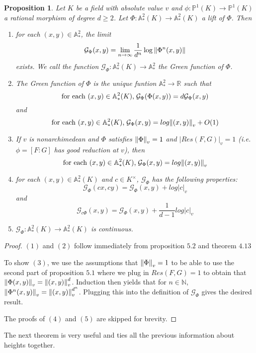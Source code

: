 \documentclass[12pt]{amsart}
\newtheorem{prop}[thm]{Proposition}
\theoremstyle{definition}
\theoremstyle{remark}
\theoremstyle{definition}
\newcommand{\R}{\mathbb{R}}
\newcommand{\AFAF}{\mathbb{A}^2}
\newcommand{\N}{\mathbb{N}}
\renewcommand{\P}{\mathbb{P}}
\newcommand{\MCG}{\mathcal{G}}
\begin{document}
\begin{prop}
Let $K$ be a field with absolute value $v$ and $\phi:\P^1(K) \rightarrow \P^1(K)$ a rational morphism of degree $d \geq 2$. Let $\Phi: \AFAF_*(K) \rightarrow \AFAF_*(K)$ a lift of $\Phi$. Then \begin{enumerate}
\item for each $(x,y) \in \AFAF_*$, the limit $$\MCG_{\Phi}(x,y) = \lim_{n \rightarrow \infty}\frac{1}{d^n}\log \norm{\Phi^n(x,y)}$$ exists. We call the function $\MCG_{\Phi}: \AFAF_*(K) \rightarrow \AFAF_*$ the Green function of $\Phi$.
\item The Green function of $\Phi$ is the unique funtion $\AFAF_* \rightarrow \R$ such that $$\text{for each $(x,y) \in \AFAF_*(K)$,\hspace{1mm}$\MCG_{\Phi}(\Phi(x,y)) = d\MCG_{\Phi}(x,y)$}$$ and $$\text{for each $(x,y) \in \AFAF_*(K)$,\hspace{1mm}$\MCG_{\Phi}(x,y) = log\norm{(x,y)}_v+O(1)$}$$
\item If $v$ is nonarchimedean and $\Phi$ satisfies $\norm{\Phi}_v = 1$ and $|Res(F,G)|_v = 1$ (i.e. $\phi = [F:G]$ has good reduction at $v$), then $$\text{for each } (x,y) \in \AFAF_*(K)\text{,\hspace{1mm}}\MCG_{\Phi}(x,y) = log\norm{(x,y)}_v$$
\item for each $(x,y) \in \AFAF_*(K)$ and $c \in K^{\times}$,  $\MCG_{\Phi}$ has the following properties: $$\MCG_{\Phi}(cx,cy) = \MCG_{\Phi}(x,y) + log|c|_v$$ and $$\MCG_{c \Phi}(x,y) = \MCG_{\Phi}(x,y) + \frac{1}{d-1}log|c|_v$$
\item $\MCG_{\Phi}: \AFAF_*(K) \rightarrow \AFAF_*(K)$ is continuous.
\end{enumerate}
\end{prop}

\begin{proof}
$(1)$ and $(2)$ follow immediately from proposition $5.2$ and theorem $4.13$

To show $(3)$, we use the assumptions that $\norm{\Phi}_v = 1$ to be able to use the second part of proposition $5.1$ where we plug in $Res(F,G) = 1$ to obtain that $\norm{\Phi(x,y)}_v = \norm{(x,y)}_v^d$. Induction then yields that for $n \in \N$, $\norm{\Phi^n(x,y)}_v = \norm{(x,y)}_v^{d^n}$. Plugging this into the definition of $\MCG_{\Phi}$ gives the desired result.

The proofs of $(4)$ and $(5)$ are skipped for brevity.
\end{proof}

The next theorem is very useful and ties all the previous information about heights together.
\end{document}
